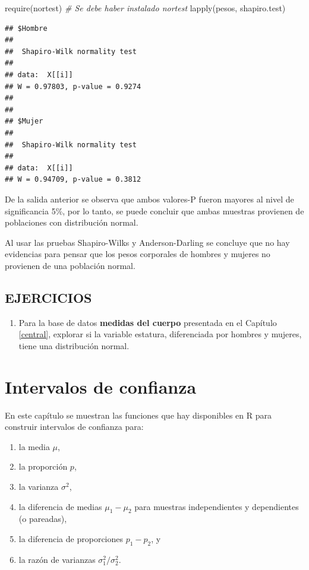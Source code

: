 \documentclass[
]{book}
\makeatletter
\newenvironment{Shaded}{\begin{snugshade}}{\end{snugshade}}
\newcommand{\CommentTok}[1]{\textcolor[rgb]{0.56,0.35,0.01}{\textit{#1}}}
\newcommand{\FunctionTok}[1]{\textcolor[rgb]{0.00,0.00,0.00}{#1}}
\newcommand{\NormalTok}[1]{#1}
\providecommand{\tightlist}{%
  \setlength{\itemsep}{0pt}\setlength{\parskip}{0pt}}
\newenvironment{kframe}{%
\medskip{}
\setlength{\fboxsep}{.8em}
 \def\at@end@of@kframe{}%
 \ifinner\ifhmode%
  \def\at@end@of@kframe{\end{minipage}}%
  \begin{minipage}{\columnwidth}%
 \fi\fi%
 \def\FrameCommand##1{\hskip\@totalleftmargin \hskip-\fboxsep
 \colorbox{shadecolor}{##1}\hskip-\fboxsep
     \hskip-\linewidth \hskip-\@totalleftmargin \hskip\columnwidth}%
 \MakeFramed {\advance\hsize-\width
   \@totalleftmargin\z@ \linewidth\hsize
   \@setminipage}}%
 {\par\unskip\endMakeFramed%
 \at@end@of@kframe}
\renewenvironment{Shaded}{\begin{kframe}}{\end{kframe}}
\makeatother
\begin{document}
\begin{Shaded}
\begin{Highlighting}[]
\FunctionTok{require}\NormalTok{(nortest) }\CommentTok{\# Se debe haber instalado nortest}
\FunctionTok{lapply}\NormalTok{(pesos, shapiro.test)}
\end{Highlighting}
\end{Shaded}

\begin{verbatim}
## $Hombre
## 
##  Shapiro-Wilk normality test
## 
## data:  X[[i]]
## W = 0.97803, p-value = 0.9274
## 
## 
## $Mujer
## 
##  Shapiro-Wilk normality test
## 
## data:  X[[i]]
## W = 0.94709, p-value = 0.3812
\end{verbatim}

De la salida anterior se observa que ambos valores-P fueron mayores al nivel de significancia 5\%, por lo tanto, se puede concluir que ambas muestras provienen de poblaciones con distribución normal.

Al usar las pruebas Shapiro-Wilks y Anderson-Darling se concluye que no hay evidencias para pensar que los pesos corporales de hombres y mujeres no provienen de una población normal.

\hypertarget{ejercicios-7}{%
\section*{EJERCICIOS}\label{ejercicios-7}}

\begin{enumerate}
\def\labelenumi{\arabic{enumi}.}
\tightlist
\item
  Para la base de datos \textbf{medidas del cuerpo} presentada en el Capítulo \ref{central}, explorar si la variable estatura, diferenciada por hombres y mujeres, tiene una distribución normal.
\end{enumerate}

\hypertarget{ic}{%
\chapter{Intervalos de confianza}\label{ic}}

En este capítulo se muestran las funciones que hay disponibles en R para construir intervalos de confianza para:

\begin{enumerate}
\def\labelenumi{\arabic{enumi}.}
\tightlist
\item
  la media \(\mu\),
\item
  la proporción \(p\),
\item
  la varianza \(\sigma^2\),
\item
  la diferencia de medias \(\mu_1-\mu_2\) para muestras independientes y dependientes (o pareadas),
\item
  la diferencia de proporciones \(p_1 - p_2\), y
\item
  la razón de varianzas \(\sigma_1^2 / \sigma_2^2\).
\end{enumerate}
\end{document}
